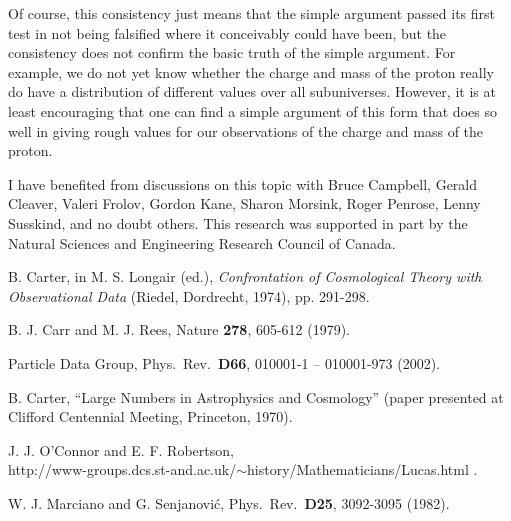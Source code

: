 \documentclass[a4paper,12pt]{article}
\begin{document}
	Of course, this consistency just means that the simple argument
passed its first test in not being falsified
where it conceivably could have been,
but the consistency does not confirm the basic truth
of the simple argument.
For example, we do not yet know whether the charge and mass of the proton
really do have a distribution of different values over all subuniverses.
However, it is at least encouraging that one can find a simple argument
of this form that does so well in giving rough values for our
observations of the charge and mass of the proton.

	I have benefited from discussions on this topic with Bruce
Campbell, Gerald Cleaver, Valeri Frolov, Gordon Kane, Sharon Morsink,
Roger Penrose, Lenny Susskind, and no doubt others.  This research was
supported in part by the Natural Sciences and Engineering Research Council
of Canada.



\baselineskip 4pt

\begin{thebibliography}{99}

  B. Carter,
in M. S. Longair (ed.),
{\em Confrontation of Cosmological Theory with Observational Data}
(Riedel, Dordrecht, 1974), pp. 291-298.

  B. J. Carr and M. J. Rees,
Nature {\bf 278}, 605-612 (1979).

  Particle Data Group,
Phys.\ Rev.\ {\bf D66}, 010001-1 -- 010001-973 (2002).

  B. Carter,
``Large Numbers in Astrophysics and Cosmology''
(paper presented at Clifford Centennial Meeting, Princeton, 1970).

  J. J. O'Connor and E. F. Robertson,\\
http://www-groups.dcs.st-and.ac.uk/$\sim$history/Mathematicians/Lucas.html .

  W. J. Marciano and G. Senjanovi\'c,
Phys.\ Rev.\ {\bf D25}, 3092-3095 (1982).



\end{thebibliography}
\end{document}
